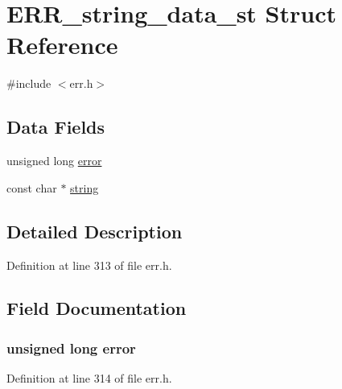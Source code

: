 \hypertarget{struct_e_r_r__string__data__st}{}\section{E\+R\+R\+\_\+string\+\_\+data\+\_\+st Struct Reference}
\label{struct_e_r_r__string__data__st}


{\ttfamily \#include $<$err.\+h$>$}

\subsection*{Data Fields}
\begin{DoxyCompactItemize}
\item 
unsigned long \hyperlink{struct_e_r_r__string__data__st_a39faec1f329a576e1825641bfa7eaa4c}{error}
\item 
const char $\ast$ \hyperlink{struct_e_r_r__string__data__st_ad4c68ea99a26b0a98ad9a79982960458}{string}
\end{DoxyCompactItemize}


\subsection{Detailed Description}


Definition at line 313 of file err.\+h.



\subsection{Field Documentation}
\subsubsection[{\texorpdfstring{error}{error}}]{\setlength{\rightskip}{0pt plus 5cm}unsigned long error}\hypertarget{struct_e_r_r__string__data__st_a39faec1f329a576e1825641bfa7eaa4c}{}\label{struct_e_r_r__string__data__st_a39faec1f329a576e1825641bfa7eaa4c}


Definition at line 314 of file err.\+h.

